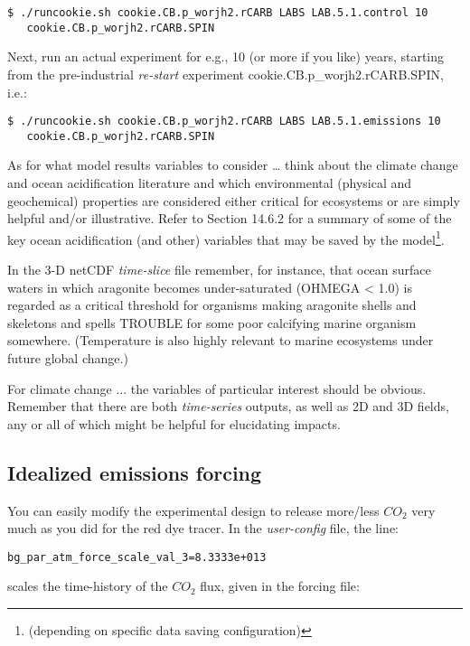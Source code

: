 \small\begin{verbatim}
$ ./runcookie.sh cookie.CB.p_worjh2.rCARB LABS LAB.5.1.control 10 
   cookie.CB.p_worjh2.rCARB.SPIN
\end{verbatim}\normalsize

\noindent Next, run an actual experiment for e.g., 10 (or more if you like) years, starting from the pre-industrial \textit{re-start} experiment \textsf{\footnotesize cookie.CB.p\_worjh2.rCARB.SPIN}, i.e.:
\small\begin{verbatim}
$ ./runcookie.sh cookie.CB.p_worjh2.rCARB LABS LAB.5.1.emissions 10 
   cookie.CB.p_worjh2.rCARB.SPIN
\end{verbatim}\normalsize

\noindent As for what model results variables to consider … think about the climate change and ocean acidification literature and which environmental (physical and geochemical) properties are considered either critical for ecosystems or are simply helpful and/or illustrative. Refer to Section 14.6.2 for a summary of some of the key ocean acidification (and other) variables that may be saved by the model\footnote{(depending on specific data saving configuration)}.

In the 3-D netCDF \textit{time-slice} file remember, for instance, that ocean surface waters in which aragonite becomes under-saturated (OHMEGA < 1.0) is regarded as a critical threshold for organisms making aragonite shells and skeletons and spells TROUBLE for some poor calcifying marine organism somewhere. (Temperature is also highly relevant to marine ecosystems under future global change.)

For climate change ... the variables of particular interest should be obvious. Remember that there are both \textit{time-series} outputs, as well as  2D and 3D fields, any or all of which might be  helpful for elucidating impacts.

\newpage

\subsection{Idealized emissions forcing}

\noindent You can easily modify the experimental design to release more/less \(CO_{2}\) very much as you did for the red dye tracer. In the \textit{user-config} file, the line:
\vspace{-2pt}\small\begin{verbatim}
bg_par_atm_force_scale_val_3=8.3333e+013
\end{verbatim}\normalsize\vspace{-2pt}
scales the time-history of the  \(CO_{2}\) flux, given in the forcing file:

